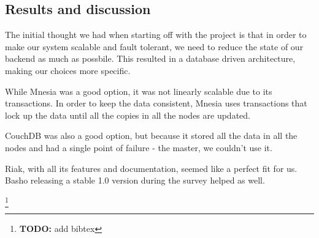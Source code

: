 \documentclass[11pt,a4paper]{report}
\newcommand{\todo}[1]{\footnote{{\color{red} {\bf TODO:} #1}}}
\begin{document}
\subsection{Results and discussion}
The initial thought we had when starting off with the project is that in order to make our system scalable and fault tolerant, we need to reduce the state of our backend as much as possbile. This resulted in a database driven architecture, making our choices more specific.

While Mnesia was a good option, it was not linearly scalable due to its transactions. In order to keep the data consistent, Mnesia uses transactions that lock up the data until all the copies in all the nodes are updated.

CouchDB was also a good option, but because it stored all the data in all the nodes and had a single point of failure - the master, we couldn't use it.

Riak, with all its features and documentation, seemed like a perfect fit for us. Basho releasing a stable 1.0 version during the survey helped as well.

\renewcommand\bibname{References}


\todo{add bibtex}
\end{document}
